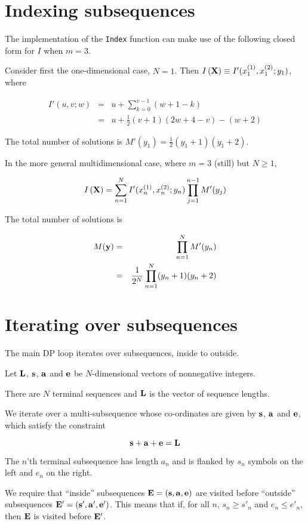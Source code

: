 \documentclass{article}
\begin{document}
\section{Indexing subsequences}

The implementation of the {\tt Index} function can make use of the following closed form for $I$ when $m=3$.

Consider first the one-dimensional case, $N=1$.
Then
$I\left({\bf X}\right) \equiv I'(x^{(1)}_1,x^{(2)}_1;y_1)$,
where

\begin{eqnarray*}
I'(u,v;w) & = & u + \sum_{k=0}^{v-1} (w + 1 - k) \\
& = & u + \frac{1}{2}(v+1)(2w+4-v) - (w+2)
\end{eqnarray*}

The total number of solutions is $M'(y_1) = \frac{1}{2}(y_1+1)(y_1+2)$.

In the more general multidimensional case, where $m=3$ (still) but $N \geq 1$,

\[
I\left({\bf X}\right)
= \sum_{n=1}^N I'(x^{(1)}_n,x^{(2)}_n;y_n) \prod_{j=1}^{n-1} M'(y_j)
\]

The total number of solutions is

\begin{eqnarray*}
M({\bf y}) & = & \prod_{n=1}^N M'(y_n) \\
& = & \frac{1}{2^N} \prod_{n=1}^N (y_n+1) (y_n+2)
\end{eqnarray*}

\section{Iterating over subsequences}

The main DP loop iterates over subsequences, inside to outside.

Let ${\bf L}$, ${\bf s}$, ${\bf a}$ and ${\bf e}$ be $N$-dimensional vectors of nonnegative integers.

There are $N$ terminal sequences and ${\bf L}$ is the vector of sequence lengths.

We iterate over a multi-subsequence whose co-ordinates are given by ${\bf s}$, ${\bf a}$ and ${\bf e}$,
which satisfy the constraint

\[
{\bf s} + {\bf a} + {\bf e} = {\bf L}
\]

The $n$'th terminal subsequence has length $a_n$
and is flanked by $s_n$ symbols on the left and $e_n$ on the right.

We require that ``inside'' subsequences ${\bf E}=({\bf s},{\bf a},{\bf e})$
are visited before ``outside'' subsequences ${\bf E}'=({\bf s}',{\bf a}',{\bf e}')$.
This means that if, for all $n$, $s_n \geq s'_n$ and $e_n \leq e'_n$,
then ${\bf E}$ is visited before ${\bf E}'$.
\end{document}
